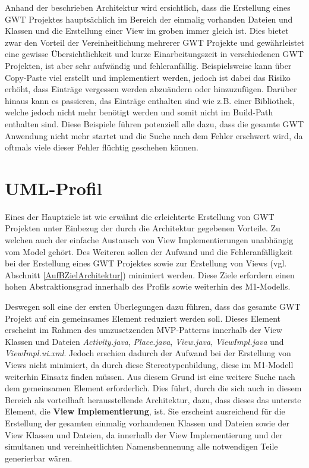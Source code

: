 Anhand der beschrieben Architektur wird ersichtlich, dass die Erstellung eines
GWT Projektes hauptsächlich im Bereich der einmalig vorhanden Dateien und
Klassen und die Erstellung einer View im groben immer gleich ist. Dies bietet
zwar den Vorteil der Vereinheitlichung mehrerer GWT Projekte und gewährleistet
eine gewisse Übersichtlichkeit und kurze Einarbeitungszeit in verschiedenen GWT
Projekten, ist aber sehr aufwändig und fehleranfällig. Beispielsweise kann über
\grqq{}Copy-Paste\grqq{} viel erstellt und implementiert werden, jedoch ist
dabei das Risiko erhöht, dass Einträge vergessen werden abzuändern oder
hinzuzufügen. Darüber hinaus kann es passieren, das Einträge enthalten sind wie
z.B. einer Bibliothek, welche jedoch nicht mehr benötigt werden und somit nicht
im Build-Path enthalten sind.
Diese Beispiele führen potenziell alle dazu, dass die gesamte GWT Anwendung nicht mehr startet
und die Suche nach dem Fehler erschwert wird, da oftmals viele dieser
Fehler flüchtig geschehen können. 
\section{UML-Profil}\label{AufBProfil}
Eines der Hauptziele ist wie erwähnt die erleichterte Erstellung von GWT
Projekten unter Einbezug der durch die Architektur gegebenen Vorteile. Zu
welchen auch der einfache Austausch von View Implementierungen unabhängig vom Model
gehört. Des Weiteren sollen der Aufwand und die Fehleranfälligkeit bei der
Erstellung eines GWT Projektes sowie zur Erstellung von Views (vgl.
Abschnitt \ref{AufBZielArchitektur}) minimiert werden. Diese Ziele
erfordern einen hohen Abstraktionsgrad innerhalb des Profils sowie weiterhin des
M1-Modells.

Deswegen soll eine der ersten Überlegungen dazu führen, dass das
gesamte GWT Projekt auf ein gemeinsames Element reduziert werden soll. Dieses
Element erscheint im Rahmen des umzusetzenden
MVP-Patterns innerhalb der View Klassen und Dateien
\textit{Activity.java}, \textit{Place.java},
\textit{View.java}, \textit{ViewImpl.java}
und \textit{ViewImpl.ui.xml}. Jedoch erschien dadurch der Aufwand bei der
Erstellung von Views nicht minimiert, da durch diese Stereotypenbildung, diese
im M1-Modell weiterhin Einsatz finden müssen. Aus diesem Grund ist eine weitere
Suche nach dem gemeinsamen Element erforderlich. Dies führt, durch die sich
auch in diesem Bereich als vorteilhaft herausstellende Architektur, dazu, dass
dieses das unterste Element, die \textbf{View Implementierung}, ist. Sie
erscheint ausreichend für die Erstellung der gesamten einmalig vorhandenen Klassen und
Dateien sowie der View Klassen und Dateien, da innerhalb der View
Implementierung und der simultanen und vereinheitlichten Namensbennenung alle
notwendigen Teile generierbar wären. 

